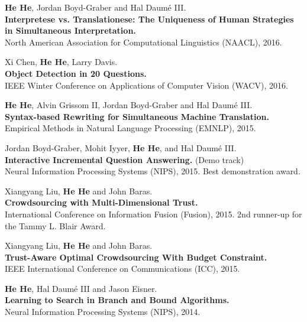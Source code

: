 \documentclass[margin,line]{resume}
\begin{document}
\begin{resume}
{\bf He He}, Jordan Boyd-Graber and Hal Daum\'e III.\\
{\bf Interpretese vs. Translationese: The Uniqueness of Human Strategies in Simultaneous Interpretation.}\\
North American Association for Computational Linguistics (NAACL), 2016.%

Xi Chen, {\bf He He}, Larry Davis.\\
{\bf Object Detection in 20 Questions.}\\
IEEE Winter Conference on Applications of Computer Vision (WACV), 2016.%

{\bf He He}, Alvin Grissom II, Jordan Boyd-Graber and Hal Daum\'e III.\\
{\bf Syntax-based Rewriting for Simultaneous Machine Translation.}\\
Empirical Methods in Natural Language Processing (EMNLP), 2015.%

Jordan Boyd-Graber, Mohit Iyyer, {\bf He He}, and Hal Daum\'e III.\\
{\bf Interactive Incremental Question Answering.} (Demo track)\\
Neural Information Processing Systems (NIPS), 2015. 
Best demonstration award.

Xiangyang Liu, {\bf He He} and John Baras.\\
{\bf Crowdsourcing with Multi-Dimensional Trust.}\\
International Conference on Information Fusion (Fusion), 2015.
2nd runner-up for the Tammy L. Blair Award.

Xiangyang Liu, {\bf He He} and John Baras.\\
{\bf Trust-Aware Optimal Crowdsourcing With Budget Constraint.}\\
IEEE International Conference on Communications (ICC), 2015.%

{\bf He He}, Hal Daum\'e III and Jason Eisner. \\
{\bf Learning to Search in Branch and Bound Algorithms.}\\
Neural Information Processing Systems (NIPS), 2014.%


\end{resume}
\end{document}
